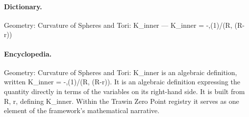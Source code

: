 \paragraph{Dictionary.}
Geometry: Curvature of Spheres and Tori: K\_inner — K\_inner = -,(1)/(R, (R-r))

\paragraph{Encyclopedia.}
Geometry: Curvature of Spheres and Tori: K\_inner is an algebraic definition, written K\_inner = -,(1)/(R, (R-r)). It is an algebraic definition expressing the quantity directly in terms of the variables on its right-hand side. It is built from R, r, defining K\_inner. Within the Trawin Zero Point registry it serves as one element of the framework's mathematical narrative.
